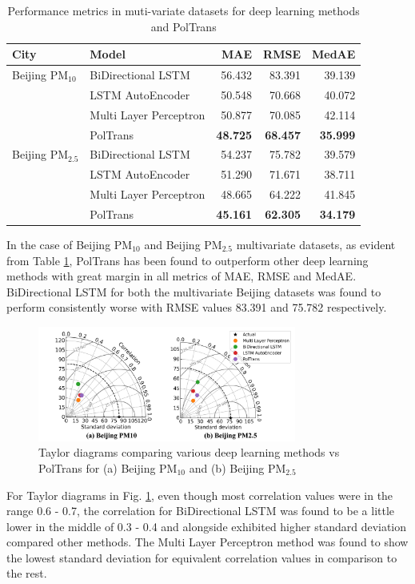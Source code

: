 \documentclass[twocolumn]{svjour3}          %
\begin{document}
\begin{table}[h]
\small
\centering
\tabcolsep=0.12cm
\caption{Performance metrics in muti-variate datasets for deep learning methods and PolTrans}
\label{tbl:m_dl-performance}
\begin{tabular}{llrrr}
\toprule
City & Model & MAE & RMSE & MedAE \\
\midrule
Beijing PM${_{10}}$ & BiDirectional LSTM & 56.432 & 83.391 & 39.139 \\
& LSTM AutoEncoder & 50.548 & 70.668 & 40.072 \\
& Multi Layer Perceptron & 50.877 & 70.085 & 42.114 \\
& PolTrans & \textbf{48.725} & \textbf{68.457} & \textbf{35.999} \\
Beijing PM${_{2.5}}$ & BiDirectional LSTM & 54.237 & 75.782 & 39.579 \\
& LSTM AutoEncoder & 51.290 & 71.671 & 38.711 \\
& Multi Layer Perceptron & 48.665 & 64.222 & 41.845 \\
& PolTrans & \textbf{45.161} & \textbf{62.305} & \textbf{34.179} \\
\bottomrule
\end{tabular}
\end{table}

In the case of Beijing PM${_{10}}$ and Beijing PM${_{2.5}}$ multivariate datasets, as evident from Table \ref{tbl:m_dl-performance}, {PolTrans} has been found to outperform other deep learning methods with great margin in all metrics of MAE, RMSE and MedAE. BiDirectional LSTM for both the multivariate Beijing datasets was found to perform consistently worse with RMSE values 83.391 and 75.782 respectively.

\begin{figure}[h]
\centering
\includegraphics[width=8.5cm]{./merged_taylor_m_dl.png}
\caption{Taylor diagrams comparing various deep learning methods vs {PolTrans} for (a) Beijing PM${_{10}}$ and (b) Beijing PM${_{2.5}}$}
\label{fig:m_dl-taylor}
\end{figure}

For Taylor diagrams in Fig. \ref{fig:m_dl-taylor}, even though most correlation values were in the range 0.6 - 0.7, the correlation for BiDirectional LSTM was found to be a little lower in the middle of 0.3 - 0.4 and alongside exhibited higher standard deviation compared other methods. The Multi Layer Perceptron method was found to show the lowest standard deviation for equivalent correlation values in comparison to the rest.
\end{document}
